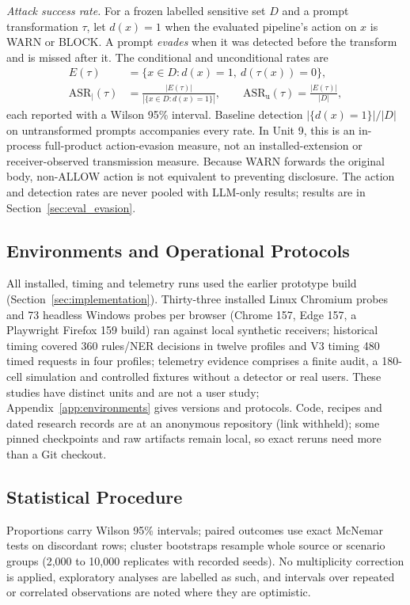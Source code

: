 \documentclass[sigconf]{acmart}
\theoremstyle{acmdefinition}\newtheorem{property}{Property}
\begin{document}
\textit{Attack success rate.} For a frozen labelled sensitive set $D$ and a prompt transformation $\tau$, let $d(x)=1$ when the evaluated pipeline's action on $x$ is WARN or BLOCK. A prompt \emph{evades} when it was detected before the transform and is missed after it. The conditional and unconditional rates are
\begin{equation}
\begin{aligned}
E(\tau)&=\{x\in D:d(x)=1,\ d(\tau(x))=0\},\\
\mathrm{ASR}_{\mid}(\tau)&=\frac{|E(\tau)|}{|\{x\in D:d(x)=1\}|},\qquad
\mathrm{ASR}_{\mathrm u}(\tau)=\frac{|E(\tau)|}{|D|},
\end{aligned}
\end{equation}
each reported with a Wilson 95\% interval. Baseline detection $|\{d(x)=1\}|/|D|$ on untransformed prompts accompanies every rate. In Unit 9, this is an in-process full-product action-evasion measure, not an installed-extension or receiver-observed transmission measure. Because WARN forwards the original body, non-ALLOW action is not equivalent to preventing disclosure. The action and detection rates are never pooled with LLM-only results; results are in Section~\ref{sec:eval_evasion}.

\subsection{Environments and Operational Protocols}
All installed, timing and telemetry runs used the earlier prototype build (Section~\ref{sec:implementation}). Thirty-three installed Linux Chromium probes and 73 headless Windows probes per browser (Chrome 157, Edge 157, a Playwright Firefox 159 build) ran against local synthetic receivers; historical timing covered 360 rules/NER decisions in twelve profiles and V3 timing 480 timed requests in four profiles; telemetry evidence comprises a finite audit, a 180-cell simulation and controlled fixtures without a detector or real users. These studies have distinct units and are not a user study; Appendix~\ref{app:environments} gives versions and protocols. Code, recipes and dated research records are at an anonymous repository (link withheld); some pinned checkpoints and raw artifacts remain local, so exact reruns need more than a Git checkout.

\subsection{Statistical Procedure}
Proportions carry Wilson 95\% intervals; paired outcomes use exact McNemar tests on discordant rows; cluster bootstraps resample whole source or scenario groups (2,000 to 10,000 replicates with recorded seeds). No multiplicity correction is applied, exploratory analyses are labelled as such, and intervals over repeated or correlated observations are noted where they are optimistic.
\end{document}
